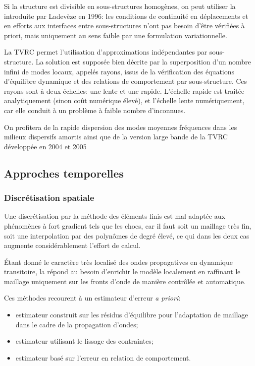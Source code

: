 Si la structure est divisible en sous-structures homogènes, on peut utiliser la  introduite par Ladevèze en 1996: les conditions de continuité en déplacements et en efforts aux interfaces entre sous-structures n'ont pas besoin d'être vérifiées à priori, mais uniquement au sens faible par une formulation variationnelle.

La TVRC permet l'utilisation d'approximations indépendantes par sous-structure. La solution est supposée bien décrite par la superposition d'un nombre infini de modes locaux, appelés rayons, issus de la vérification des équations d'équilibre dynamique et des relations de comportement par sous-structure. Ces rayons sont à deux échelles: une lente et une rapide. L'échelle rapide est traitée analytiquement (sinon coût numérique élevé), et l'échelle lente numériquement, car elle conduit à un problème à faible nombre d'inconnues.

On profitera de la rapide dispersion des modes moyennes fréquences dans les milieux dispersifs amortis ainsi que de la version large bande de la TVRC développée en 2004 et 2005~\cite{Lit-Chevreuil}

\medskip
\subsection{Approches temporelles}

\subsubsection{Discrétisation spatiale}
Une discrétisation par la méthode des éléments finis est mal adaptée aux phénomènes à fort gradient tels que les chocs, car il faut soit un maillage très fin, soit une interpolation par des polynômes de degré élevé, ce qui dans les deux cas augmente considérablement l'effort de calcul.

Étant donné le caractère très localisé des ondes propagatives en dynamique transitoire, la  répond au besoin d'enrichir le modèle localement en raffinant le maillage uniquement sur les fronts d'onde de manière contrôlée et automatique.

Ces méthodes recourent à un estimateur d'erreur \emph{a priori}:
\begin{itemize}
	\item estimateur construit sur les résidus d'équilibre pour l'adaptation de
		maillage dans le cadre de la propagation d'ondes;
	\item estimateur utilisant le lissage des contraintes;
	\item estimateur basé sur l'erreur en relation de comportement.
\end{itemize}

